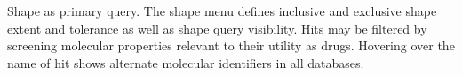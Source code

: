 \label{fig:shapefig} Shape as primary query. The shape menu defines inclusive and exclusive shape extent and tolerance as well as shape query visibility. Hits may be filtered by screening molecular properties relevant to their utility as drugs. Hovering over the name of hit shows alternate molecular identifiers in all databases. 